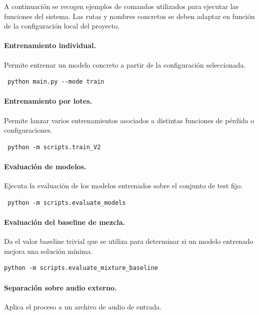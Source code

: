 A continuación se recogen ejemplos de comandos utilizados para ejecutar las funciones del sistema. Las rutas y nombres concretos se deben adaptar en función de la configuración local del proyecto.

\paragraph{Entrenamiento individual.} Permite entrenar un modelo concreto a partir de la configuración seleccionada.

\begin{verbatim} python main.py --mode train \end{verbatim}

\paragraph{Entrenamiento por lotes.} Permite lanzar varios entrenamientos asociados a distintas
funciones de pérdida o configuraciones.

\begin{verbatim} python -m scripts.train_V2 \end{verbatim}

\paragraph{Evaluación de modelos.} Ejecuta la evaluación de los modelos entrenados sobre el conjunto de test fijo.

\begin{verbatim} python -m scripts.evaluate_models \end{verbatim}

\paragraph{Evaluación del baseline de mezcla.} Da el valor baseline trivial que se utiliza para determinar si un modelo entrenado mejora una solución mínima.

\begin{verbatim}
python -m scripts.evaluate_mixture_baseline
\end{verbatim}

\paragraph{Separación sobre audio externo.} Aplica el proceso a un archivo de audio de entrada.

